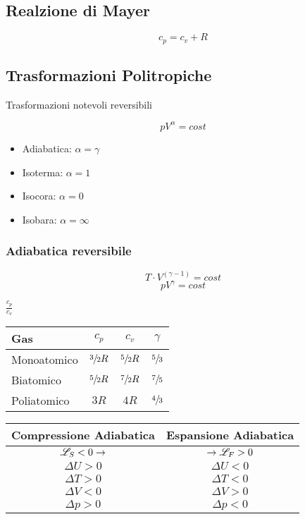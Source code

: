 

\subsection{Realzione di Mayer}
\begin{equation}
    c_p = c_v + R
\end{equation}

\subsection{Trasformazioni Politropiche}
Trasformazioni notevoli reversibili

\[
pV^\alpha = cost
\]

\begin{itemize}
    \item Adiabatica: $\alpha = \gamma $
    \item Isoterma: $\alpha = 1$
    \item Isocora: $\alpha = 0$
    \item Isobara: $\alpha = \infty$
\end{itemize}

\subsubsection{Adiabatica reversibile}
\begin{equation}
    T \cdot V ^{(\gamma - 1)} = cost
\end{equation}
\begin{equation}
    p V ^{\gamma} = cost
\end{equation}

\Def{$\gamma$} $\frac{c_p}{c_v}$
\begin{center}
\begin{tabular}{| l | c | c | c |}
    \hline
    \textbf{Gas} & \textbf{$c_p$} & \textbf{$c_v$} & \textbf{$\gamma$} \\
    \hline
    Monoatomico & $\sfrac{3}{2} R$ & $\sfrac{5}{2} R$ & $\sfrac{5}{3}$\\
    Biatomico & $\sfrac{5}{2} R$ & $\sfrac{7}{2} R$ & $\sfrac{7}{5}$\\
    Poliatomico & $3 R$ & $4 R$ & $\sfrac{4}{3}$\\
    \hline
\end{tabular}
\end{center}

\begin{center}
\begin{tabular}{| c | c |}
    \hline
    \textbf{Compressione Adiabatica} & \textbf{Espansione Adiabatica} \\
    \hline
    $\mathscr{L}_S < 0 \to$ & $ \to \mathscr{L}_F > 0$ \\
    \hline
    $\Delta U > 0$ & $\Delta U < 0$\\
    $\Delta T > 0$ & $\Delta T < 0$\\
    $\Delta V < 0$ & $\Delta V > 0$\\
    $\Delta p > 0$ & $\Delta p < 0$\\
    \hline
\end{tabular}
\end{center}

